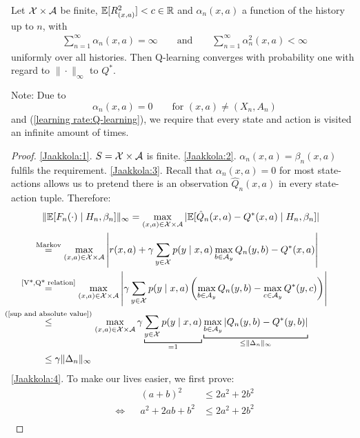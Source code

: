 \begin{corollary}[Q-learning]
    Let \(\mathcal{X}\times\mathcal{A}\) be finite, \(\mathbb{E}[R_{(x,a)}^2]<c\in\mathbb{R}\) and \(\alpha_n(x,a)\) a function of the history up to \(n\), with
    \begin{align}\label{learning rate:Q-learning}
        \sum_{n=1}^\infty \alpha_n(x,a)=\infty \qquad \text{and}\qquad \sum_{n=1}^\infty \alpha_n^2(x,a)<\infty
    \end{align}
    uniformly over all histories.
    Then Q-learning converges with probability one with regard to \(\|\cdot\|_\infty\) to \(Q^*\). 
\end{corollary}
Note: Due to 
    \[
        \alpha_n(x,a)=0 \qquad \text{for } (x,a)\neq (X_n,A_n) 
    \]
    and (\ref{learning rate:Q-learning}), we require that every state and action is visited an infinite amount of times.
\begin{proof}
    \ref{Jaakkola:1}. \(S=\mathcal{X}\times\mathcal{A}\) is finite.
    \ref{Jaakkola:2}. \(\alpha_n(x,a)=\beta_n(x,a)\) fulfils the requirement.
    \ref{Jaakkola:3}. Recall that \(\alpha_n(x,a)=0\) for most state-actions allows us to pretend there is an observation \(\hat{Q}_n(x,a)\) in every state-action tuple. Therefore:
    \begin{align*}
        &\|\E[F_n(\cdot)\mid H_n, \beta_n]\|_\infty
        =\max_{(x,a)\in\cX\times\cA} |\E[\hat{Q}_n(x,a)-Q^*(x,a)\mid H_n, \beta_n]|\\
        &\lxeq{\text{Markov}}\max_{(x,a)\in\cX\times\cA}
        \left|r(x,a)+\gamma\sum_{y\in\cX}p(y\mid x,a)\max_{b\in\cA_y}Q_n(y,b) -Q^*(x,a)\right|\\
        &\lxeq{\text{\ref{V*,Q* relation}}}\max_{(x,a)\in\cX\times\cA}
        \left|\gamma\sum_{y\in\cX}p(y\mid x,a)\left(
            \max_{b\in\cA_y}Q_n(y,b) - \max_{c\in\cA_y}Q^*(y,c) 
        \right)\right|\\
        &\lxlq{\text{(\ref{sup and absolute value})}} \max_{(x,a)\in\cX\times\cA} \gamma \underbracket[0.7pt]{\sum_{y\in\cX}p(y\mid x,a)}_{=1}  
        \underbracket[0.7pt]{
            \max_{b\in\cA_y}\left|Q_n(y,b)-Q^*(y,b)\right|
        }_{\le \|\Delta_n\|_\infty}\\
        &\le \gamma \|\Delta_n\|_\infty
    \end{align*}
\ref{Jaakkola:4}. To make our lives easier, we first prove:
\begin{align}
    && (a+b)^2 &\le 2a^2+2b^2 \label{stupid binomial inequality}\\
    \iff&& a^2+2ab +b^2 &\le 2a^2+2b^2\nonumber\\

\end{align}
\end{proof}
